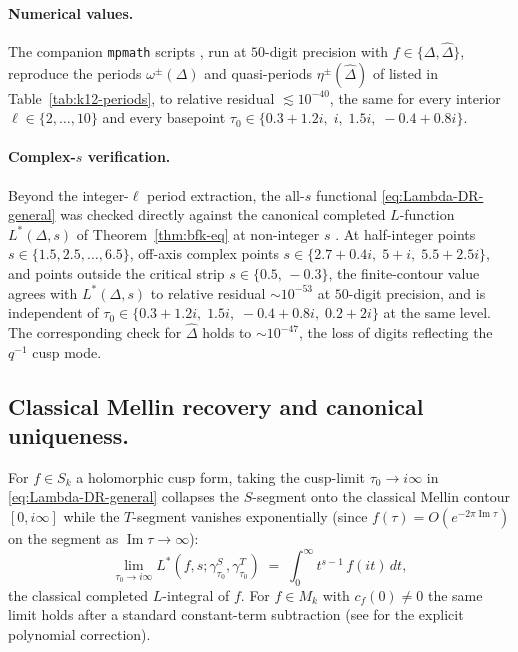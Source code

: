 \documentclass[11pt]{article}
\numberwithin{equation}{section}  %
\newcommand{\Dhat}{\widehat{\Delta}}
\DeclareMathOperator{\im}{Im}
\begin{document}
\paragraph{Numerical values.}
The companion \texttt{mpmath} scripts \cite{VerifyScripts}, run at
$50$-digit precision with $f \in \{\Delta, \Dhat\}$, reproduce the
periods $\omega^\pm(\Delta)$ and quasi-periods $\eta^\pm(\Dhat)$ of
\cite{Brown2017} listed in Table~\ref{tab:k12-periods}, to relative
residual $\lesssim 10^{-40}$, the same for every interior
$\ell \in \{2, \ldots, 10\}$ and every basepoint
$\tau_0 \in \{0.3 + 1.2 i,\; i,\; 1.5 i,\; -0.4 + 0.8 i\}$.

\paragraph{Complex-$s$ verification.}
Beyond the integer-$\ell$ period extraction, the all-$s$ functional
\eqref{eq:Lambda-DR-general} was checked directly against the canonical
completed $L$-function $L^*(\Delta, s)$ of Theorem~\ref{thm:bfk-eq} at
non-integer $s$ \cite{VerifyScripts}.  At half-integer points
$s \in \{1.5, 2.5, \ldots, 6.5\}$, off-axis complex points
$s \in \{2.7 + 0.4i,\; 5 + i,\; 5.5 + 2.5i\}$, and points outside the
critical strip $s \in \{0.5,\, -0.3\}$, the finite-contour value agrees
with $L^*(\Delta, s)$ to relative residual $\sim 10^{-53}$ at $50$-digit
precision, and is independent of $\tau_0 \in \{0.3 + 1.2i,\; 1.5i,\;
-0.4 + 0.8i,\; 0.2 + 2i\}$ at the same level.  The corresponding check
for $\Dhat$ holds to $\sim 10^{-47}$, the loss of digits reflecting the
$q^{-1}$ cusp mode.

\subsection{Classical Mellin recovery and canonical uniqueness.}\label{sec:Connection-w-previous-weak-MF-l-functions}
For $f \in S_k$ a holomorphic cusp form, taking the cusp-limit
$\tau_0 \to i\infty$ in \eqref{eq:Lambda-DR-general} collapses the
$S$-segment onto the classical Mellin contour $[0, i\infty]$ while
the $T$-segment vanishes exponentially (since $f(\tau) =
O(e^{-2\pi\im\tau})$ on the segment as $\im\tau \to \infty$):
\begin{equation}\label{eq:Mellin-recovery}
  \lim_{\tau_0 \to i\infty}\!
  L^*(f, s; \gamma^S_{\tau_0}, \gamma^T_{\tau_0})
  \;=\; \int_0^\infty\! t^{s - 1}\,f(it)\,dt,
\end{equation}
the classical completed $L$-integral of $f$.  For $f \in M_k$ with
$c_f(0) \ne 0$ the same limit holds after a standard constant-term
subtraction (see \cite[Lemma~2.1]{1806} for the explicit polynomial
correction).
\end{document}
